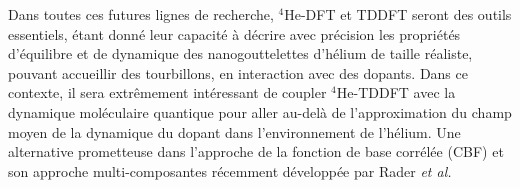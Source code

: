 		Dans toutes ces futures lignes de recherche, $^4$He-DFT et TDDFT seront des outils essentiels, étant donné leur capacité à décrire avec précision les propriétés d'équilibre et de dynamique des nanogouttelettes d'hélium de taille réaliste, pouvant accueillir des tourbillons, en interaction avec des dopants. 
		Dans ce contexte, il sera extrêmement intéressant de coupler $^4$He-TDDFT avec la dynamique moléculaire quantique pour aller au-delà de l'approximation du champ moyen de la dynamique du dopant dans l'environnement de l'hélium. 
		Une alternative prometteuse dans l'approche de la fonction de base corrélée (CBF) et son approche multi-composantes récemment développée par Rader \textit{et al.}\citep{Rader2017}
